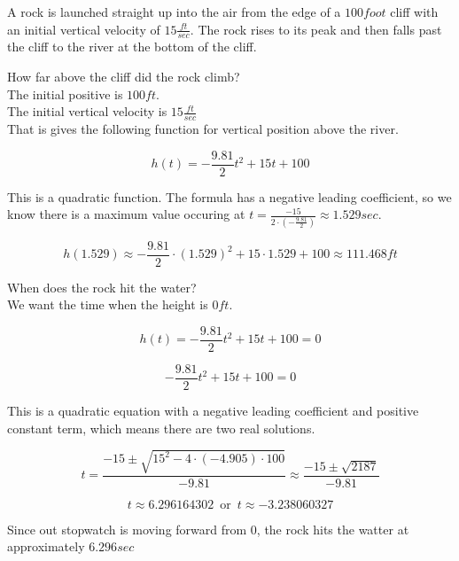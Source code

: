 \documentclass{ximera}
\author{Lee Wayand}
\begin{document}
\begin{exercise} 



A rock is launched straight up into the air from the edge of a $100 foot$ cliff with an initial vertical velocity of $15 \frac{ft}{sec}$.  The rock rises to its peak and then falls past the cliff to the river at the bottom of the cliff.



\begin{question} How far above the cliff did the rock climb? \\




The initial positive is $100 ft$. \\
The initial vertical velocity is $15 \frac{ft}{sec}$ \\


That is gives the following function for vertical position above the river.

\[
h(t)= -\frac{9.81}{2} t^2 + 15 t + 100
\]


This is a quadratic function.  The formula has a negative leading coefficient, so we know there is a maximum value occuring at $t = \frac{-15}{2 \cdot (-\frac{9.81}{2})} \approx 1.529 sec$.



\[
h(1.529) \approx -\frac{9.81}{2} \cdot (1.529)^2 + 15 \cdot 1.529 + 100 \approx 111.468 ft
\]

\end{question}







\begin{question} When does the rock hit the water? \\



We want the time when the height is $0 ft$.



\[
h(t)= -\frac{9.81}{2} t^2 + 15 t + 100 = 0
\]


\[
-\frac{9.81}{2} t^2 + 15 t + 100 = 0
\]



This is a quadratic equation with a negative leading coefficient and positive constant term, which means there are two real solutions.



\[
t = \frac{-15 \pm \sqrt{15^2 - 4 \cdot (-4.905) \cdot 100}}{-9.81} \approx \frac{-15 \pm \sqrt{2187}}{-9.81} 
\]



\[
t \approx 6.296164302  \,  \text{ or } \, t \approx -3.238060327
\]



Since out stopwatch is moving forward from $0$, the rock hits the watter at approximately $6.296 sec$
\end{question}









\end{exercise}
\end{document}
